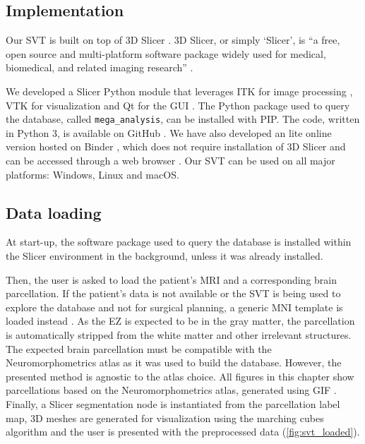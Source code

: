 \subsection{Implementation}
\label{sec:svt_implementation}

Our \ac{SVT} is built on top of 3D Slicer \cite{fedorov_3d_2012}.
3D Slicer, or simply `Slicer', is ``a free, open source and multi-platform software package widely used for medical, biomedical, and related imaging research''%
.

We developed a Slicer Python module that leverages \ac{ITK} for image processing \cite{mccormick_itk_2014}, \ac{VTK} for visualization \cite{schroeder_visualization_2006} and Qt for the \ac{GUI}%
.
The Python package used to query the \svtdatabase database, called \texttt{mega\_analysis}, can be installed with \ac{PIP}.
The code, written in Python 3, is available on GitHub%
\fnurl{\svtgithub}.
We have also developed an lite online version hosted on Binder \cite{bussonnier_binder_2018}, which does not require installation of 3D Slicer and can be accessed through a web browser%
\fnurl{\svtweb}.
Our \ac{SVT} can be used on all major platforms: Windows, Linux and macOS.


\subsection{Data loading}
\label{sec:svt_loading}

At start-up, the software package used to query the database is installed within the Slicer environment in the background, unless it was already installed.

Then, the user is asked to load the patient's \ac{MRI} and a corresponding brain parcellation.
If the patient's data is not available or the \ac{SVT} is being used to explore the database and not for surgical planning, a generic \ac{MNI} template is loaded instead \cite{fonov_unbiased_2009}.
As the \ac{EZ} is expected to be in the gray matter, the parcellation is automatically stripped from the white matter and other irrelevant structures.
The expected brain parcellation must be compatible with the Neuromorphometrics atlas as it was used to build the \svtdatabase database.
However, the presented method is agnostic to the atlas choice.
All figures in this chapter show parcellations based on the Neuromorphometrics atlas, generated using \ac{GIF} \cite{cardoso_geodesic_2015}.
Finally, a Slicer segmentation node is instantiated from the parcellation label map, 3D meshes are generated for visualization using the marching cubes algorithm \cite{lorensen_marching_1987,pinter_polymorph_2019} and the user is presented with the preprocessed data (\cref{fig:svt_loaded}).

